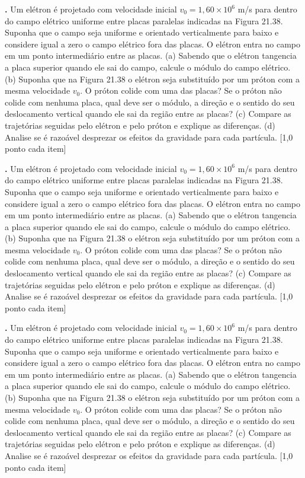 \documentclass[a4paper,10pt]{article}
\newcounter{mine}
\newcommand{\quest}{\ifthenelse{ \equal{\themine}{1} }{
}{
  \vspace{0.5cm}
}  \noindent \textbf{\themine. } \setcounter{mine}{\themine + 1}}
\begin{document}
\begin{multicols*}{2}
    		
    \quest Um elétron é projetado com velocidade inicial $v_0=1,60×10^6$  m/s para dentro do campo elétrico uniforme entre placas paralelas indicadas na Figura 21.38. Suponha que o campo seja uniforme e orientado verticalmente para baixo e considere igual a zero o campo elétrico fora das placas. O elétron entra no campo em um ponto intermediário entre as placas. (a) Sabendo que o elétron tangencia a placa superior quando ele sai do campo, calcule o módulo do campo elétrico. (b) Suponha que na Figura 21.38 o elétron seja substituído por um próton com a mesma velocidade $v_0$. O próton colide com uma das placas? Se o próton não colide com nenhuma placa, qual deve ser o módulo, a direção e o sentido do seu deslocamento vertical quando ele sai da região entre as placas? (c) Compare as trajetórias seguidas pelo elétron e pelo próton e explique as diferenças. (d) Analise se é razoável desprezar os efeitos da gravidade para cada partícula. [1,0 ponto cada item]
    
    \quest Um elétron é projetado com velocidade inicial $v_0=1,60×10^6$  m/s para dentro do campo elétrico uniforme entre placas paralelas indicadas na Figura 21.38. Suponha que o campo seja uniforme e orientado verticalmente para baixo e considere igual a zero o campo elétrico fora das placas. O elétron entra no campo em um ponto intermediário entre as placas. (a) Sabendo que o elétron tangencia a placa superior quando ele sai do campo, calcule o módulo do campo elétrico. (b) Suponha que na Figura 21.38 o elétron seja substituído por um próton com a mesma velocidade $v_0$. O próton colide com uma das placas? Se o próton não colide com nenhuma placa, qual deve ser o módulo, a direção e o sentido do seu deslocamento vertical quando ele sai da região entre as placas? (c) Compare as trajetórias seguidas pelo elétron e pelo próton e explique as diferenças. (d) Analise se é razoável desprezar os efeitos da gravidade para cada partícula. [1,0 ponto cada item]
    
    \quest Um elétron é projetado com velocidade inicial $v_0=1,60×10^6$  m/s para dentro do campo elétrico uniforme entre placas paralelas indicadas na Figura 21.38. Suponha que o campo seja uniforme e orientado verticalmente para baixo e considere igual a zero o campo elétrico fora das placas. O elétron entra no campo em um ponto intermediário entre as placas. (a) Sabendo que o elétron tangencia a placa superior quando ele sai do campo, calcule o módulo do campo elétrico. (b) Suponha que na Figura 21.38 o elétron seja substituído por um próton com a mesma velocidade $v_0$. O próton colide com uma das placas? Se o próton não colide com nenhuma placa, qual deve ser o módulo, a direção e o sentido do seu deslocamento vertical quando ele sai da região entre as placas? (c) Compare as trajetórias seguidas pelo elétron e pelo próton e explique as diferenças. (d) Analise se é razoável desprezar os efeitos da gravidade para cada partícula. [1,0 ponto cada item]
    

\end{multicols*}
\end{document}
